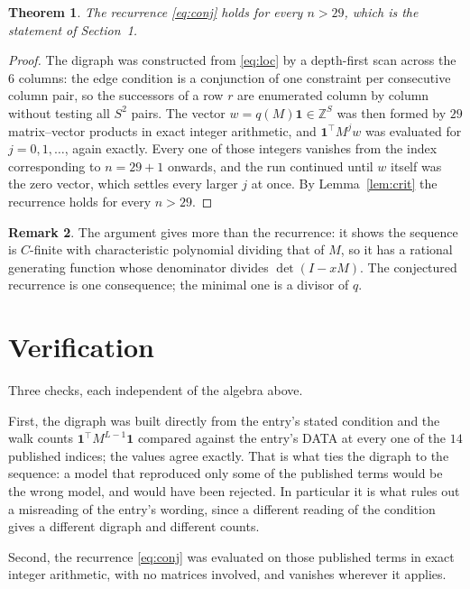 \documentclass[11pt,a4paper]{article}
\theoremstyle{plain}
\newtheorem{theorem}{Theorem}
\theoremstyle{definition}
\newtheorem{remark}[theorem]{Remark}
\begin{document}
\begin{theorem}
The recurrence \eqref{eq:conj} holds for every $n>29$, which is the statement of
Section~1.
\end{theorem}

\begin{proof}
The digraph was constructed from \eqref{eq:loc} by a depth-first scan across the $6$
columns: the edge condition is a conjunction of one constraint per consecutive column
pair, so the successors of a row $r$ are enumerated column by column without testing all
$S^2$ pairs. The vector $w=q(M)\mathbf{1}\in\mathbb{Z}^{S}$ was then formed by $29$
matrix--vector products in exact integer arithmetic, and $\mathbf{1}^{\!\top}M^{j}w$ was
evaluated for $j=0,1,\dots$, again exactly. Every one of those integers vanishes from the
index corresponding to $n=29+1$ onwards, and the run continued until $w$ itself was the
zero vector, which settles every larger $j$ at once. By Lemma~\ref{lem:crit} the recurrence
holds for every $n>29$.
\end{proof}

\begin{remark}
The argument gives more than the recurrence: it shows the sequence is $C$-finite with
characteristic polynomial dividing that of $M$, so it has a rational generating function
whose denominator divides $\det(I-xM)$. The conjectured recurrence is one consequence; the
minimal one is a divisor of $q$.
\end{remark}

\section{Verification}

Three checks, each independent of the algebra above.

First, the digraph was built directly from the entry's stated condition and the walk counts
$\mathbf{1}^{\!\top}M^{L-1}\mathbf{1}$ compared against the entry's DATA at
every one of the $14$ published indices; the values agree exactly. That is what ties
the digraph to the sequence: a model that reproduced only some of the published terms would
be the wrong model, and would have been rejected. In particular it is what rules out a
misreading of the entry's wording, since a different reading of the condition gives a
different digraph and different counts.

Second, the recurrence \eqref{eq:conj} was evaluated on those published terms in exact
integer arithmetic, with no matrices involved, and vanishes wherever it applies.
\end{document}
